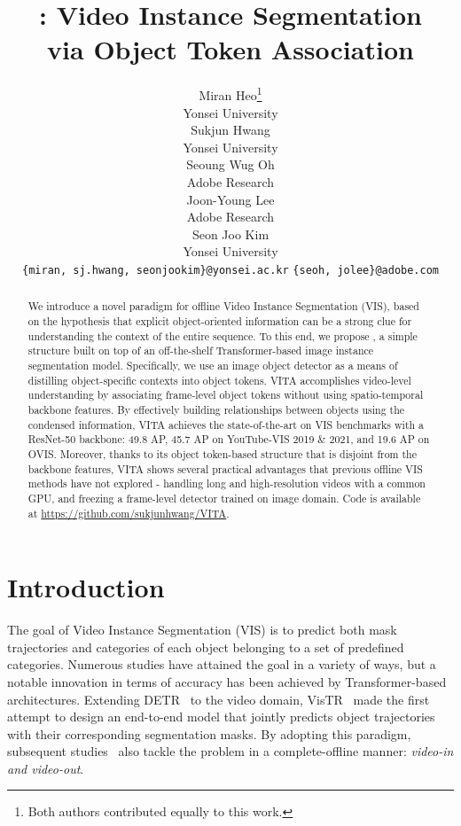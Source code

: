 \documentclass{article}
\title{\textmyfont{VITA}: Video Instance Segmentation\\via Object Token Association}
\author{Miran Heo\thanks{Both authors contributed equally to this work.} \\
  Yonsei University\\
\vspace{-6mm}
   \And
   Sukjun Hwang \\
   Yonsei University \\
\vspace{-6mm}
   \AND
   Seoung Wug Oh \\
   Adobe Research \\
\vspace{-7mm}
   \And
   Joon-Young Lee \\
   Adobe Research \\
\vspace{-7mm}
   \And
   Seon Joo Kim \\
   Yonsei University \\
\vspace{-7mm}
  \AND
  \texttt{\{miran, sj.hwang, seonjookim\}@yonsei.ac.kr}
  \And
  \texttt{\{seoh, jolee\}@adobe.com}
}
\begin{document}
\maketitle

\begin{abstract}
We introduce a novel paradigm for offline Video Instance Segmentation (VIS), based on the hypothesis that explicit object-oriented information can be a strong clue for understanding the context of the entire sequence.
To this end, we propose , a simple structure built on top of an off-the-shelf Transformer-based image instance segmentation model.
Specifically, we use an image object detector as a means of distilling object-specific contexts into object tokens.
VITA accomplishes video-level understanding by associating frame-level object tokens without using spatio-temporal backbone features.
By effectively building relationships between objects using the condensed information,
VITA achieves the state-of-the-art on VIS benchmarks with a ResNet-50 backbone: 49.8 AP, 45.7 AP on YouTube-VIS 2019 \& 2021, and 19.6 AP on OVIS.
Moreover, thanks to its object token-based structure that is disjoint from the backbone features, VITA shows several practical advantages that previous offline VIS methods have not explored - handling long and high-resolution videos with a common GPU, and freezing a frame-level detector trained on image domain. Code is available at \url{https://github.com/sukjunhwang/VITA}.




\end{abstract} \section{Introduction}
\label{sec:intro}
The goal of Video Instance Segmentation (VIS) is to predict both mask trajectories and categories of each object belonging to a set of predefined categories.
Numerous studies have attained the goal in a variety of ways, but a notable innovation in terms of accuracy has been achieved by Transformer-based~\cite{Transformer} architectures.
Extending DETR~\cite{DETR} to the video domain, VisTR~\cite{VisTR} made the first attempt to design an end-to-end model that jointly predicts object trajectories with their corresponding segmentation masks.
By adopting this paradigm, subsequent studies~\cite{IFC, SeqFormer, Mask2Former-VIS, TeViT} also tackle the problem in a complete-offline manner: \emph{video-in and video-out}.
\end{document}
